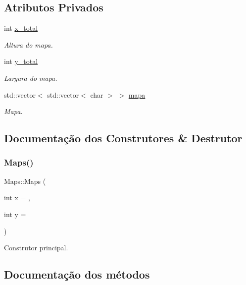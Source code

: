 \subsection*{Atributos Privados}
\begin{DoxyCompactItemize}
\item 
int \hyperlink{classMaps_aad719df183010234d9888873e9926970}{x\+\_\+total}
\begin{DoxyCompactList}\small\item\em Altura do mapa. \end{DoxyCompactList}\item 
int \hyperlink{classMaps_af6b314d34d63fc6f1567251e4b84447b}{y\+\_\+total}
\begin{DoxyCompactList}\small\item\em Largura do mapa. \end{DoxyCompactList}\item 
std\+::vector$<$ std\+::vector$<$ char $>$ $>$ \hyperlink{classMaps_a7549d33bd2d17520c6b25bc43916bee6}{mapa}
\begin{DoxyCompactList}\small\item\em Mapa. \end{DoxyCompactList}\end{DoxyCompactItemize}


\subsection{Documentação dos Construtores \& Destrutor}
\mbox{\label{classMaps_ab6b20c54c22fc74b5e1d72fb245047b4}} 
\subsubsection{\texorpdfstring{Maps()}{Maps()}}
{\footnotesize\ttfamily Maps\+::\+Maps (\begin{DoxyParamCaption}\item[{int}]{x = {},  }\item[{int}]{y = {} }\end{DoxyParamCaption})\hspace{0.3cm}{\ttfamily [inline]}}



Construtor principal. 



\subsection{Documentação dos métodos}
\mbox{\label{classMaps_aea314b57c9d092f2a40eed4f3e2fa196}} 
